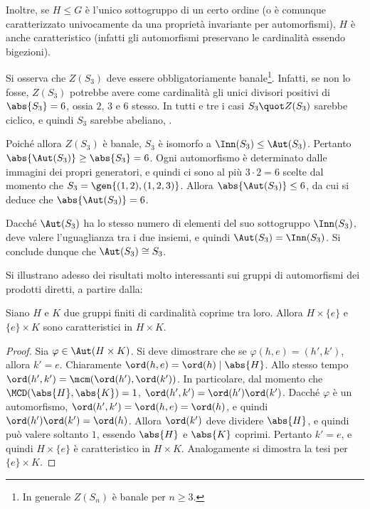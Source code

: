 \documentclass[12pt]{scrartcl}
\begin{document}
	
	Inoltre, se $H \leq G$ è l'unico sottogruppo di un certo ordine (o è comunque
	caratterizzato univocamente da una proprietà invariante per automorfismi),
	$H$ è anche caratteristico (infatti gli automorfismi preservano le cardinalità essendo
	bigezioni). \bigskip
	
	
	\begin{example} %
		Si osserva che $Z(S_3)$ deve essere obbligatoriamente
		banale\footnote{
			In generale $Z(S_n)$ è banale per $n \geq 3$.
		}. Infatti, se non lo fosse, $Z(S_3)$ potrebbe
		avere come cardinalità gli unici divisori positivi di
		$\abs{S_3} = 6$, ossia $2$, $3$ e $6$ stesso. In tutti
		e tre i casi $S_3 \quot Z(S_3)$ sarebbe ciclico, e quindi
		$S_3$ sarebbe abeliano, \Lightning. \medskip
		
		
		Poiché allora $Z(S_3)$ è banale, $S_3$ è isomorfo a
		$\Inn(S_3) \leq \Aut(S_3)$. Pertanto $\abs{\Aut(S_3)} \geq \abs{S_3} = 6$. Ogni automorfismo è
		determinato dalle immagini dei propri generatori, e quindi
		ci sono al più $3 \cdot 2 = 6$ scelte dal momento che
		$S_3 = \gen{(1,2), (1,2,3)}$. Allora
		$\abs{\Aut(S_3)} \leq 6$, da cui si deduce che
		$\abs{\Aut(S_3)} = 6$. \medskip
		
		
		Dacché $\Aut(S_3)$ ha lo stesso numero di elementi
		del suo sottogruppo $\Inn(S_3)$, deve valere l'uguaglianza
		tra i due insiemi, e quindi $\Aut(S_3) = \Inn(S_3)$. Si
		conclude dunque che $\Aut(S_3) \cong S_3$.
	\end{example}
	
	
	Si illustrano adesso dei risultati molto interessanti sui gruppi di automorfismi
	dei prodotti diretti, a partire dalla:
	
	\begin{proposition}
		Siano $H$ e $K$ due gruppi finiti di cardinalità coprime tra loro. Allora
		$H \times \{e\}$ e $\{e\} \times K$ sono caratteristici in $H \times K$.
	\end{proposition}
	
	\begin{proof}
		Sia $\varphi \in \Aut(H \times K)$. Si deve dimostrare che se
		$\varphi(h, e) = (h', k')$, allora $k' = e$. Chiaramente
		$\ord(h, e) = \ord(h) \mid \abs{H}$. Allo stesso tempo
		$\ord(h', k') = \mcm(\ord(h'), \ord(k'))$. In particolare, dal momento
		che $\MCD(\abs{H}, \abs{K}) = 1$, $\ord(h', k') = \ord(h') \ord(k')$.
		Dacché $\varphi$ è un automorfismo, $\ord(h', k') = \ord(h, e) = \ord(h)$, e
		quindi $\ord(h') \ord(k') = \ord(h)$. Allora $\ord(k')$ deve dividere
		$\abs{H}$, e quindi può valere soltanto $1$, essendo $\abs{H}$ e
		$\abs{K}$ coprimi. Pertanto $k' = e$, e quindi $H \times \{e\}$ è caratteristico
		in $H \times K$. Analogamente si dimostra la tesi per $\{e\} \times K$.
	\end{proof}
	
\end{document}
